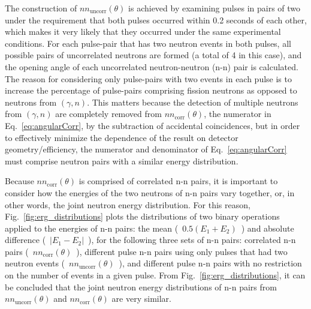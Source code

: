 The construction of $nn_{\text{uncorr}}(\theta)$ is achieved by examining pulses in pairs of two under the requirement that both pulses occurred within 0.2 seconds of each other, which makes it very likely that they occurred under the same experimental conditions.
For each pulse-pair that has two neutron events in both pulses, all possible pairs of uncorrelated neutrons are formed (a total of 4 in this case), and the opening angle of each uncorrelated neutron-neutron (n-n) pair is calculated.
The reason for considering only pulse-pairs with two events in each pulse is to increase the percentage of pulse-pairs comprising fission neutrons as opposed to neutrons from $(\gamma,n)$.
This matters because the detection of multiple neutrons from $(\gamma,n)$ are completely removed from $nn_{\text{corr}}(\theta)$, the numerator in Eq.~\ref{eq:angularCorr}, by the subtraction of accidental coincidences, but in order to effectively minimize the dependence of the result on detector geometry/efficiency, the numerator and denominator of Eq.~\ref{eq:angularCorr} must comprise neutron pairs with a similar energy distribution.

Because $nn_{\text{corr}}(\theta)$ is comprised of correlated n-n pairs, it is important to consider how the energies of the two neutrons of n-n pairs vary together, or, in other words, the joint neutron energy distribution.
For this reason, Fig.~\ref{fig:erg_distributions} plots the distributions of two binary operations applied to the energies of n-n pairs: the mean (~$0.5(E_{1} + E_{2})$~) and absolute difference (~$|E_1 - E_2|$~), for the following three sets of n-n pairs: correlated n-n pairs (~$nn_{\text{corr}}(\theta)$~), different pulse n-n pairs using only pulses that had two neutron events (~$nn_{\text{uncorr}}(\theta)$~), and different pulse n-n pairs with no restriction on the number of events in a given pulse.
From Fig.~\ref{fig:erg_distributions}, it can be concluded that the joint neutron energy distributions of n-n pairs from $nn_{\text{uncorr}}(\theta)$ and $nn_{\text{corr}}(\theta)$ are very similar.

